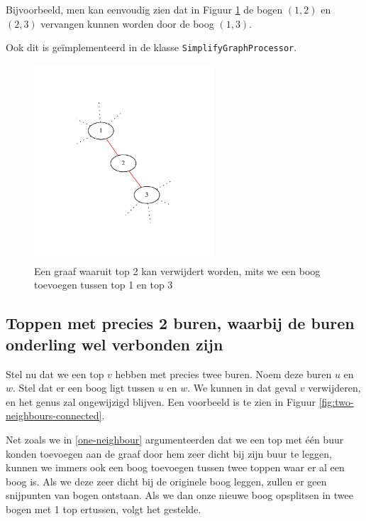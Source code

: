 \documentclass{article}
\begin{document}
Bijvoorbeeld, men kan eenvoudig zien dat in Figuur
\ref{fig:two-neighbours-not-connected} de bogen $(1, 2)$ en $(2, 3)$ vervangen
kunnen worden door de boog $(1, 3)$.
\newline

Ook dit is ge\"implementeerd in de klasse \verb#SimplifyGraphProcessor#.

\begin{figure}
\begin{center}
\includegraphics[width=0.6\textwidth]{images/two-neighbours-not-connected.pdf}
\caption{Een graaf waaruit top 2 kan verwijdert worden, mits we een boog
toevoegen tussen top 1 en top 3}
\label{fig:two-neighbours-not-connected}
\end{center}
\end{figure}

\subsection{Toppen met precies 2 buren, waarbij de buren onderling wel
verbonden zijn}
Stel nu dat we een top $v$ hebben met precies twee buren. Noem deze buren
$u$ en $w$. Stel dat er een boog ligt tussen $u$ en $w$. We kunnen in dat
geval $v$ verwijderen, en het genus zal ongewijzigd blijven. Een voorbeeld is
te zien in Figuur \ref{fig:two-neighbours-connected}.
\newline

Net zoals we in \ref{one-neighbour} argumenteerden dat we een top met \'e\'en
buur konden toevoegen aan de graaf door hem zeer dicht bij zijn buur te leggen,
kunnen we immers ook een boog toevoegen tussen twee toppen waar er al een boog
is. Als we deze zeer dicht bij de originele boog leggen, zullen er geen
snijpunten van bogen ontstaan. Als we dan onze nieuwe boog opsplitsen in twee
bogen met 1 top ertussen, volgt het gestelde.
\newline
\end{document}
